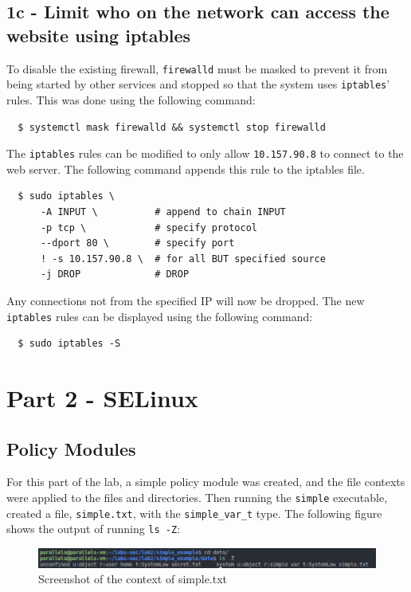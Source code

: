 \documentclass[11pt]{article}
\begin{document}
\subsection*{1c - Limit who on the network can access the website using iptables}
To disable the existing firewall, \verb|firewalld| must be masked to prevent it from being started by other services and stopped so that the system uses
\verb|iptables|' rules. This was done using the following command:
\begin{verbatim}
  $ systemctl mask firewalld && systemctl stop firewalld
\end{verbatim}
The \verb|iptables| rules can be modified to only allow \verb|10.157.90.8| to connect to the web server.
The following command appends this rule to the iptables file.
\begin{verbatim}
  $ sudo iptables \
      -A INPUT \          # append to chain INPUT
      -p tcp \            # specify protocol
      --dport 80 \        # specify port
      ! -s 10.157.90.8 \  # for all BUT specified source
      -j DROP             # DROP
\end{verbatim}
Any connections not from the specified IP will now be dropped.
The new \verb|iptables| rules can be displayed using the following command:
\begin{verbatim}
  $ sudo iptables -S
\end{verbatim}

\section*{Part 2 - SELinux}
\label{sec:part-1}
\subsection*{Policy Modules}
For this part of the lab, a simple policy module was created, and the file contexts were applied to the files and directories.
Then running the \verb|simple| executable, created a file, \verb|simple.txt|, with the \verb|simple_var_t| type.
The following figure shows the output of running \verb|ls -Z|:
\begin{figure}[htbp]
  \centering
  \includegraphics[width=.9\linewidth]{./ls-z.png}
  \caption{\label{fig:ls-z}
  Screenshot of the context of simple.txt}
\end{figure}
\end{document}

